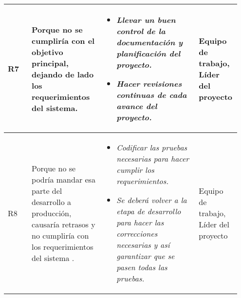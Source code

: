 \documentclass[12pt,a4paper]{article}
\begin{document}
\begin{table}[h!]
\begin{tabular}{|p{0.10\linewidth}|p{0.30\linewidth}|p{0.40\linewidth}|p{0.15\linewidth}|}
R7&Porque no se cumpliría con el objetivo principal, dejando de lado los requerimientos del sistema.&\begin{itemize}
\item \textit{Llevar un buen control de la documentación y planificación del proyecto.}
\item \textit{Hacer revisiones continuas de cada avance del proyecto.}
\end{itemize} 
&Equipo de trabajo, Líder del proyecto\\\hline

R8&Porque no se podría mandar esa parte del desarrollo a producción, causaría retrasos y no cumpliría con los requerimientos del sistema .&\begin{itemize}
\item \textit{Codificar las pruebas necesarias para hacer cumplir los requerimientos.}
\item \textit{Se deberá volver a la etapa de desarrollo para hacer las correcciones necesarias y así garantizar que se pasen todas las pruebas.}
\end{itemize} 
&Equipo de trabajo, Líder del proyecto\\\hline

\end{tabular}
\end{table}
\end{document}
